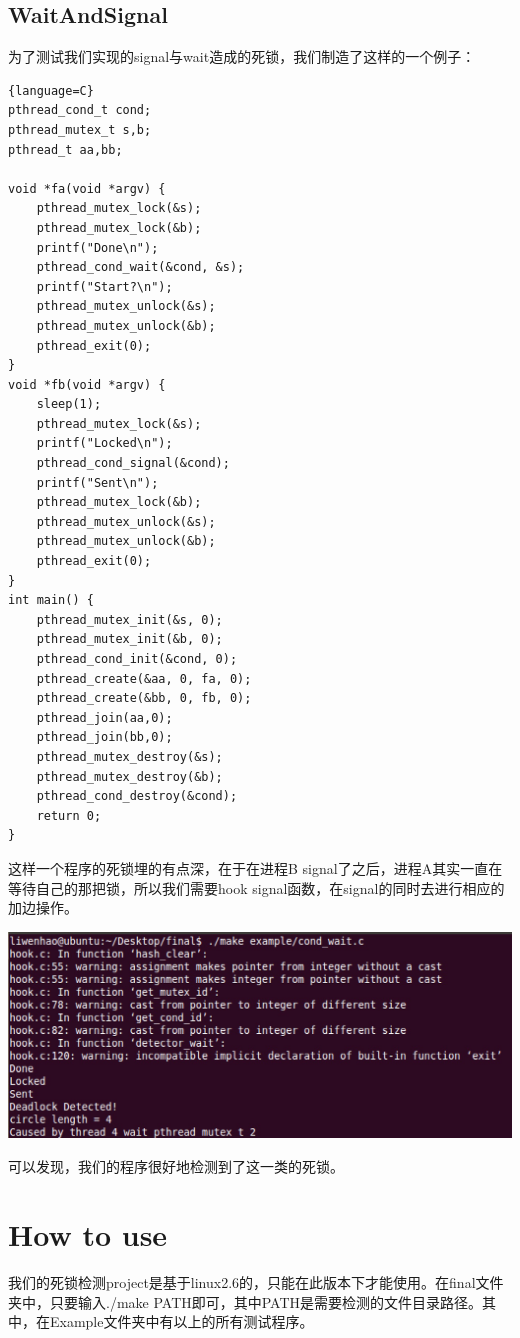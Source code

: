 \documentclass[titlepage]{article}
\begin{document}
\subsection{WaitAndSignal}
\indent 为了测试我们实现的signal与wait造成的死锁，我们制造了这样的一个例子：
\begin{lstlisting}{language=C}
pthread_cond_t cond;
pthread_mutex_t s,b;
pthread_t aa,bb;

void *fa(void *argv) {
	pthread_mutex_lock(&s);
	pthread_mutex_lock(&b);
	printf("Done\n");
	pthread_cond_wait(&cond, &s);
	printf("Start?\n");
	pthread_mutex_unlock(&s);
	pthread_mutex_unlock(&b);
	pthread_exit(0);
}
void *fb(void *argv) {
	sleep(1);
	pthread_mutex_lock(&s);
	printf("Locked\n");
	pthread_cond_signal(&cond);
	printf("Sent\n");
	pthread_mutex_lock(&b);
	pthread_mutex_unlock(&s);
	pthread_mutex_unlock(&b);
	pthread_exit(0);
}
int main() {
	pthread_mutex_init(&s, 0);
	pthread_mutex_init(&b, 0);
	pthread_cond_init(&cond, 0);
	pthread_create(&aa, 0, fa, 0);
	pthread_create(&bb, 0, fb, 0);
	pthread_join(aa,0);
	pthread_join(bb,0);
	pthread_mutex_destroy(&s);
	pthread_mutex_destroy(&b);
	pthread_cond_destroy(&cond);
	return 0;
}

\end{lstlisting}
\indent 这样一个程序的死锁埋的有点深，在于在进程B signal了之后，进程A其实一直在等待自己的那把锁，所以我们需要hook signal函数，在signal的同时去进行相应的加边操作。

\begin{center}
\footnotesize
\includegraphics[scale=0.4]{example4.png}
\normalsize
\end{center}
\indent 可以发现，我们的程序很好地检测到了这一类的死锁。

\section{How to use}
我们的死锁检测project是基于linux2.6的，只能在此版本下才能使用。在final文件夹中，只要输入./make PATH即可，其中PATH是需要检测的文件目录路径。其中，在Example文件夹中有以上的所有测试程序。
\end{document}
